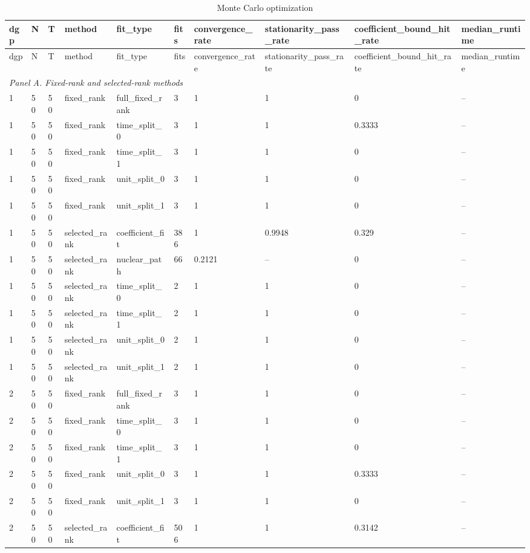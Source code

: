 \begingroup
\small
\begin{longtable}{llllllllll}
\caption{Monte Carlo optimization}\label{tab:mc-optimization}\\
\toprule
dgp & N & T & method & fit\_type & fits & convergence\_rate & stationarity\_pass\_rate & coefficient\_bound\_hit\_rate & median\_runtime \\
\midrule
\endfirsthead
\toprule
dgp & N & T & method & fit\_type & fits & convergence\_rate & stationarity\_pass\_rate & coefficient\_bound\_hit\_rate & median\_runtime \\
\midrule
\endhead
\multicolumn{10}{l}{\textit{Panel A. Fixed-rank and selected-rank methods}} \\
1 & 50 & 50 & fixed\_rank & full\_fixed\_rank & 3 & 1 & 1 & 0 & -- \\
1 & 50 & 50 & fixed\_rank & time\_split\_0 & 3 & 1 & 1 & 0.3333 & -- \\
1 & 50 & 50 & fixed\_rank & time\_split\_1 & 3 & 1 & 1 & 0 & -- \\
1 & 50 & 50 & fixed\_rank & unit\_split\_0 & 3 & 1 & 1 & 0 & -- \\
1 & 50 & 50 & fixed\_rank & unit\_split\_1 & 3 & 1 & 1 & 0 & -- \\
1 & 50 & 50 & selected\_rank & coefficient\_fit & 386 & 1 & 0.9948 & 0.329 & -- \\
1 & 50 & 50 & selected\_rank & nuclear\_path & 66 & 0.2121 & -- & 0 & -- \\
1 & 50 & 50 & selected\_rank & time\_split\_0 & 2 & 1 & 1 & 0 & -- \\
1 & 50 & 50 & selected\_rank & time\_split\_1 & 2 & 1 & 1 & 0 & -- \\
1 & 50 & 50 & selected\_rank & unit\_split\_0 & 2 & 1 & 1 & 0 & -- \\
1 & 50 & 50 & selected\_rank & unit\_split\_1 & 2 & 1 & 1 & 0 & -- \\
2 & 50 & 50 & fixed\_rank & full\_fixed\_rank & 3 & 1 & 1 & 0 & -- \\
2 & 50 & 50 & fixed\_rank & time\_split\_0 & 3 & 1 & 1 & 0 & -- \\
2 & 50 & 50 & fixed\_rank & time\_split\_1 & 3 & 1 & 1 & 0 & -- \\
2 & 50 & 50 & fixed\_rank & unit\_split\_0 & 3 & 1 & 1 & 0.3333 & -- \\
2 & 50 & 50 & fixed\_rank & unit\_split\_1 & 3 & 1 & 1 & 0 & -- \\
2 & 50 & 50 & selected\_rank & coefficient\_fit & 506 & 1 & 1 & 0.3142 & -- \\

\end{longtable}

